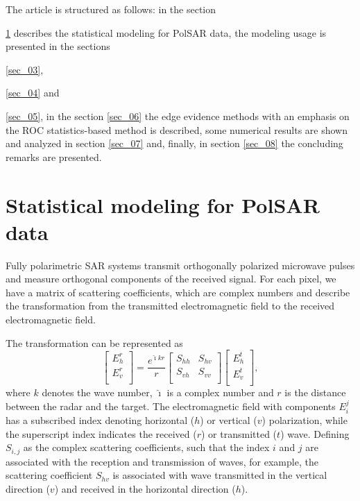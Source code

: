 \documentclass[conference]{IEEEtran}
\begin{document}
The article is structured as follows: in the section {\ref{sec_02} describes the statistical modeling for PolSAR data, the modeling usage is presented in the sections {\ref{sec_03}, {\ref{sec_04} and {\ref{sec_05}, in the section \ref{sec_06}  the edge evidence methods with an emphasis on the ROC statistics-based method is described, some numerical results are shown and analyzed in section \ref{sec_07} and, finally, in section \ref{sec_08} the concluding remarks are presented.

\section{Statistical modeling for PolSAR data}\label{sec_02}
Fully polarimetric SAR systems transmit orthogonally polarized microwave pulses and measure orthogonal components of the received signal. For each pixel, we have a matrix of scattering coefficients, which are complex numbers and describe the transformation from the transmitted electromagnetic field to the received electromagnetic field.

The transformation can be represented as
\begin{equation*}
 \left[
\begin{array}{c}
	E_{h}^{r}   \\
	E_{v}^{r}    \\
\end{array}
\right]
 = \frac{e^{\hat{\imath} kr}}{r}\left[
\begin{array}{cc}
	S_{hh}   & S_{hv}   \\
	S_{vh}   & S_{vv}   \\
\end{array}
\right]
 \left[
\begin{array}{c}
	E_{h}^{t}   \\
	E_{v}^{t}    \\
\end{array}
\right],
\end{equation*}
where $k$ denotes the wave number, $\hat{\imath}$ is a complex number and $r$ is the distance between the radar and the target. The electromagnetic field with components $E_{i}^{j}$ has a subscribed index denoting horizontal ($h$) or vertical ($v$) polarization, while the superscript index indicates the received ($r$) or transmitted ($t$) wave. Defining $S_{i,j}$ as the complex scattering coefficients, such that the index $i$ and $j$ are associated with the reception and transmission of waves, for example, the scattering coefficient $S_{hv}$ is associated with wave transmitted in the vertical direction ($v$) and received in the horizontal direction ($h$).

}}}}
\end{document}
